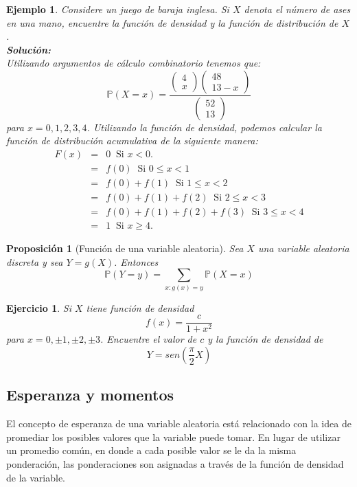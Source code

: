 \documentclass[11pt]{report}
\theoremstyle{break}
\newtheorem{proposicion}{Proposición}[chapter]
\newtheorem{ejercicio}{Ejercicio}[chapter]
\newtheorem{ejemplo}{Ejemplo}[chapter]
\theoremstyle{break}
\begin{document}
\begin{ejemplo}
Considere un juego de baraja inglesa. Si $X$ denota el número de ases en una mano, encuentre la función de densidad y la función de distribución de $X$.\\
\textbf{Solución:}\\
Utilizando argumentos de cálculo combinatorio tenemos que:
$$
\mathbb{P}(X = x) = \dfrac{\begin{pmatrix} 4 \\ x
\end{pmatrix} \begin{pmatrix} 48 \\ 13 - x \end{pmatrix}} { \begin{pmatrix} 52 \\ 13\end{pmatrix} }
$$
para $x =0,1,2,3,4$.
Utilizando la función de densidad, podemos calcular la función de distribución acumulativa de la siguiente manera:
$$
\begin{array}{lcr}
F(x) & = & 0 \medspace \mbox{ Si } x < 0.\\
 & = & f(0) \medspace \mbox{ Si } 0\leq x < 1\\
 & = & f(0) + f(1) \medspace \mbox{ Si } 1\leq x < 2\\
 & = & f(0) + f(1) + f(2) \medspace \mbox{ Si } 2\leq x < 3\\
 & = & f(0) + f(1) + f(2) + f(3) \medspace \mbox{ Si } 3\leq x < 4\\
 & = & 1 \medspace \mbox{ Si } x \geq 4.
\end{array}
$$
\end{ejemplo}

\begin{proposicion}[Función de una variable aleatoria]
\label{proposicion:funcion de una variable aleatoria}
Sea $X$ una variable aleatoria discreta y sea $Y = g(X)$. Entonces
$$
\mathbb{P}(Y = y) = \sum_{x: g(x) = y} \mathbb{P}(X = x)
$$
\end{proposicion}

\begin{ejercicio}
Si $X$ tiene función de densidad
$$
f(x) = \dfrac{c}{1 + x^2}
$$
para $x = 0, \pm 1, \pm 2, \pm 3$. Encuentre el valor de $c$ y la función de densidad de
$$
Y = sen\left( \dfrac{\pi}{2}X \right)
$$
\end{ejercicio}

\subsection{Esperanza y momentos}
El concepto de esperanza de una variable aleatoria está relacionado con la idea de promediar los posibles valores que la variable puede tomar. En lugar de utilizar un promedio común, en donde a cada posible valor se le da la misma ponderación, las ponderaciones son asignadas a través de la función de densidad de la variable.
\end{document}
